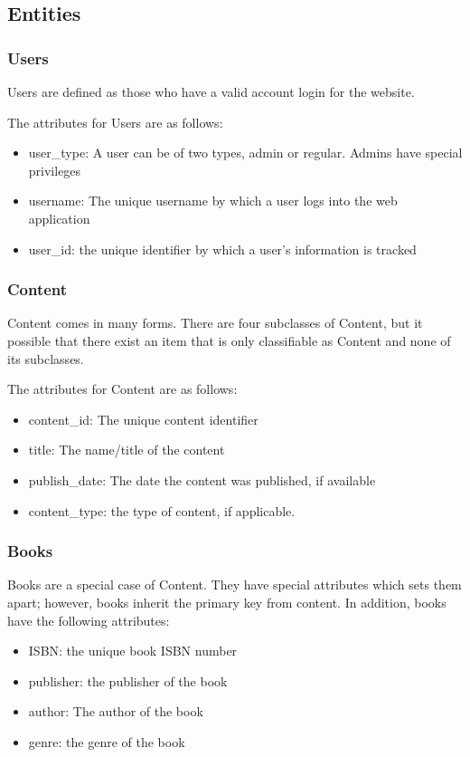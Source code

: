 \documentclass[letter, 12pt, titlepage]{article}
\begin{document}
\subsection{Entities}
\subsubsection{Users}
Users are defined as those who have a valid account login for the website.

The attributes for Users are as follows:
\begin{itemize}
	\item user\_type: A user can be of two types, admin or regular. Admins have special privileges
	\item username: The unique username by which a user logs into the web application
	\item user\_id: the unique identifier by which a user's information is tracked
\end{itemize}
\subsubsection{Content}
Content comes in many forms. There are four subclasses of Content, but it possible that there exist an item that is only classifiable as Content and none of its subclasses.

The attributes for Content are as follows:
\begin{itemize}
	\item content\_id: The unique content identifier
	\item title: The name/title of the content
	\item publish\_date: The date the content was published, if available
	\item content\_type: the type of content, if applicable.
\end{itemize}
\subsubsection{Books}
Books are a special case of Content. They have special attributes which sets them apart; however, books inherit the primary key from content. In addition, books have the following attributes:
\begin{itemize}
	\item ISBN: the unique book ISBN number
	\item publisher: the publisher of the book
	\item author: The author of the book
	\item genre: the genre of the book
\end{itemize}
\end{document}
